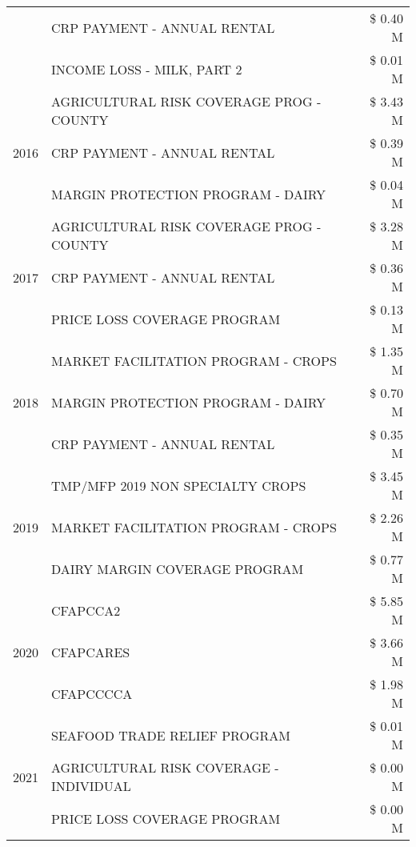 \begin{tabular}{llr}
 & CRP PAYMENT - ANNUAL RENTAL & \$ 0.40 M \\
 & INCOME LOSS - MILK, PART 2 & \$ 0.01 M \\
\cline{1-3}
\multirow[t]{3}{*}{2016} & AGRICULTURAL RISK COVERAGE PROG - COUNTY & \$ 3.43 M \\
 & CRP PAYMENT - ANNUAL RENTAL & \$ 0.39 M \\
 & MARGIN PROTECTION PROGRAM - DAIRY & \$ 0.04 M \\
\cline{1-3}
\multirow[t]{3}{*}{2017} & AGRICULTURAL RISK COVERAGE PROG - COUNTY & \$ 3.28 M \\
 & CRP PAYMENT - ANNUAL RENTAL & \$ 0.36 M \\
 & PRICE LOSS COVERAGE PROGRAM & \$ 0.13 M \\
\cline{1-3}
\multirow[t]{3}{*}{2018} & MARKET FACILITATION PROGRAM - CROPS & \$ 1.35 M \\
 & MARGIN PROTECTION PROGRAM - DAIRY & \$ 0.70 M \\
 & CRP PAYMENT - ANNUAL RENTAL & \$ 0.35 M \\
\cline{1-3}
\multirow[t]{3}{*}{2019} & TMP/MFP 2019 NON SPECIALTY CROPS & \$ 3.45 M \\
 & MARKET FACILITATION PROGRAM - CROPS & \$ 2.26 M \\
 & DAIRY MARGIN COVERAGE PROGRAM & \$ 0.77 M \\
\cline{1-3}
\multirow[t]{3}{*}{2020} & CFAPCCA2 & \$ 5.85 M \\
 & CFAPCARES & \$ 3.66 M \\
 & CFAPCCCCA & \$ 1.98 M \\
\cline{1-3}
\multirow[t]{3}{*}{2021} & SEAFOOD TRADE RELIEF PROGRAM & \$ 0.01 M \\
 & AGRICULTURAL RISK COVERAGE - INDIVIDUAL & \$ 0.00 M \\
 & PRICE LOSS COVERAGE PROGRAM & \$ 0.00 M \\
\cline{1-3}
\bottomrule
\end{tabular}
